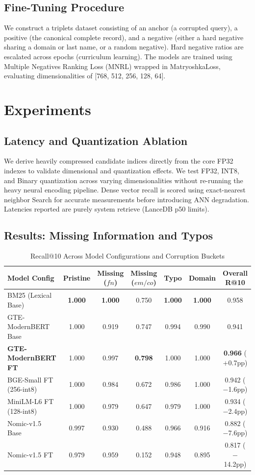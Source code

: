 \documentclass{article}
\begin{document}
\subsection{Fine-Tuning Procedure}
We construct a triplets dataset consisting of an anchor (a corrupted query), a positive (the canonical complete record), and a negative (either a hard negative sharing a domain or last name, or a random negative). Hard negative ratios are escalated across epochs (curriculum learning).
The models are trained using Multiple Negatives Ranking Loss (MNRL) \cite{henderson2017efficient} wrapped in MatryoshkaLoss, evaluating dimensionalities of [768, 512, 256, 128, 64]. 

\section{Experiments}

\subsection{Latency and Quantization Ablation}
We derive heavily compressed candidate indices directly from the core FP32 indexes to validate dimensional and quantization effects. We test FP32, INT8, and Binary quantization across varying dimensionalities without re-running the heavy neural encoding pipeline. Dense vector recall is scored using exact-nearest neighbor Search for accurate measurements before introducing ANN degradation. Latencies reported are purely system retrieve (LanceDB p50 limits).

\subsection{Results: Missing Information and Typos}

\begin{table}[h]
\centering
\caption{Recall@10 Across Model Configurations and Corruption Buckets}
\begin{tabular}{lcccccc}
\toprule
\textbf{Model Config} & \textbf{Pristine} & \textbf{Missing} ($fn$) & \textbf{Missing} ($em/co$) & \textbf{Typo} & \textbf{Domain}  & \textbf{Overall R@10} \\ \midrule
BM25 (Lexical Base) & \textbf{1.000} & \textbf{1.000} & 0.750 & \textbf{1.000} & \textbf{1.000} & 0.958 \\ 
GTE-ModernBERT Base & 1.000 & 0.919 & 0.747 & 0.994 & 0.990 & 0.941 \\ 
\textbf{GTE-ModernBERT FT} & 1.000 & 0.997 & \textbf{0.798} & 1.000 & 1.000 & \textbf{0.966} ($+$0.7pp) \\ 
BGE-Small FT (256-int8) & 1.000 & 0.984 & 0.672 & 0.986 & 1.000 & 0.942 ($-$1.6pp) \\
MiniLM-L6 FT (128-int8) & 1.000 & 0.979 & 0.647 & 0.979 & 1.000 & 0.934 ($-$2.4pp) \\
Nomic-v1.5 Base & 0.997 & 0.930 & 0.488 & 0.966 & 0.916 & 0.882 ($-$7.6pp) \\
Nomic-v1.5 FT & 0.979 & 0.959 & 0.152 & 0.948 & 0.895 & 0.817 ($-$14.2pp) \\
\bottomrule
\end{tabular}
\end{table}
\end{document}
